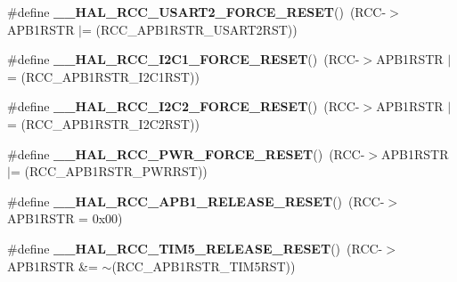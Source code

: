 \begin{DoxyCompactItemize}
\item 
\#define {\bfseries \+\_\+\+\_\+\+H\+A\+L\+\_\+\+R\+C\+C\+\_\+\+U\+S\+A\+R\+T2\+\_\+\+F\+O\+R\+C\+E\+\_\+\+R\+E\+S\+ET}()~(R\+CC-\/$>$A\+P\+B1\+R\+S\+TR $\vert$= (R\+C\+C\+\_\+\+A\+P\+B1\+R\+S\+T\+R\+\_\+\+U\+S\+A\+R\+T2\+R\+ST))\hypertarget{group___r_c_c___a_p_b1___force___release___reset_gab4de80173ffa0e599baab0e76d562cc3}{}\label{group___r_c_c___a_p_b1___force___release___reset_gab4de80173ffa0e599baab0e76d562cc3}

\item 
\#define {\bfseries \+\_\+\+\_\+\+H\+A\+L\+\_\+\+R\+C\+C\+\_\+\+I2\+C1\+\_\+\+F\+O\+R\+C\+E\+\_\+\+R\+E\+S\+ET}()~(R\+CC-\/$>$A\+P\+B1\+R\+S\+TR $\vert$= (R\+C\+C\+\_\+\+A\+P\+B1\+R\+S\+T\+R\+\_\+\+I2\+C1\+R\+ST))\hypertarget{group___r_c_c___a_p_b1___force___release___reset_ga551c171f88af86ca985db634ac9e3275}{}\label{group___r_c_c___a_p_b1___force___release___reset_ga551c171f88af86ca985db634ac9e3275}

\item 
\#define {\bfseries \+\_\+\+\_\+\+H\+A\+L\+\_\+\+R\+C\+C\+\_\+\+I2\+C2\+\_\+\+F\+O\+R\+C\+E\+\_\+\+R\+E\+S\+ET}()~(R\+CC-\/$>$A\+P\+B1\+R\+S\+TR $\vert$= (R\+C\+C\+\_\+\+A\+P\+B1\+R\+S\+T\+R\+\_\+\+I2\+C2\+R\+ST))\hypertarget{group___r_c_c___a_p_b1___force___release___reset_gaed404dfdc9bc032cf718b7ed17f664f0}{}\label{group___r_c_c___a_p_b1___force___release___reset_gaed404dfdc9bc032cf718b7ed17f664f0}

\item 
\#define {\bfseries \+\_\+\+\_\+\+H\+A\+L\+\_\+\+R\+C\+C\+\_\+\+P\+W\+R\+\_\+\+F\+O\+R\+C\+E\+\_\+\+R\+E\+S\+ET}()~(R\+CC-\/$>$A\+P\+B1\+R\+S\+TR $\vert$= (R\+C\+C\+\_\+\+A\+P\+B1\+R\+S\+T\+R\+\_\+\+P\+W\+R\+R\+ST))\hypertarget{group___r_c_c___a_p_b1___force___release___reset_gaf454341fae45fdfacfea2f45c07ce3e0}{}\label{group___r_c_c___a_p_b1___force___release___reset_gaf454341fae45fdfacfea2f45c07ce3e0}

\item 
\#define {\bfseries \+\_\+\+\_\+\+H\+A\+L\+\_\+\+R\+C\+C\+\_\+\+A\+P\+B1\+\_\+\+R\+E\+L\+E\+A\+S\+E\+\_\+\+R\+E\+S\+ET}()~(R\+CC-\/$>$A\+P\+B1\+R\+S\+TR = 0x00)\hypertarget{group___r_c_c___a_p_b1___force___release___reset_ga9d0742ab271ace3dbe1a4e83de3d017b}{}\label{group___r_c_c___a_p_b1___force___release___reset_ga9d0742ab271ace3dbe1a4e83de3d017b}

\item 
\#define {\bfseries \+\_\+\+\_\+\+H\+A\+L\+\_\+\+R\+C\+C\+\_\+\+T\+I\+M5\+\_\+\+R\+E\+L\+E\+A\+S\+E\+\_\+\+R\+E\+S\+ET}()~(R\+CC-\/$>$A\+P\+B1\+R\+S\+TR \&= $\sim$(R\+C\+C\+\_\+\+A\+P\+B1\+R\+S\+T\+R\+\_\+\+T\+I\+M5\+R\+ST))\hypertarget{group___r_c_c___a_p_b1___force___release___reset_gaf7e0cde5ea8f6425d87ebf2d91e8b360}{}\label{group___r_c_c___a_p_b1___force___release___reset_gaf7e0cde5ea8f6425d87ebf2d91e8b360}


\end{DoxyCompactItemize}
